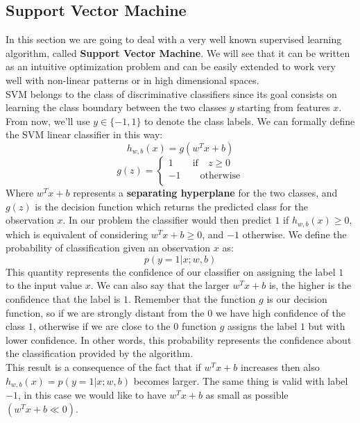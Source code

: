 \newpage
\subsection{Support Vector Machine}
In this section we are going to deal with a very well known supervised learning algorithm, called \textbf{Support Vector Machine}. We will see that it can be written as an intuitive optimization problem and can be easily extended to work very well with non-linear patterns or in high dimensional spaces.\\

SVM belongs to the class of discriminative classifiers since its goal consists on learning the class boundary between the two classes $y$ starting from features $x$. From now, we'll use $y\in\{-1,1\}$ to denote the class labels.
We can formally define the SVM linear classifier in this way:
$$h_{w,b}(x) = g(w^Tx + b)$$
$$
g(z)=
\begin{cases}
1\qquad \text{if} \quad z \geq 0\\
-1\qquad \text{otherwise}\\
\end{cases}
$$
Where $w^Tx + b$ represents a \textbf{separating hyperplane} for the two classes, and $g(z)$ is the decision function which returns the predicted class for the observation $x$.
In our problem the classifier would then predict $1$ if $h_{w,b}(x) \geq 0$, which is equivalent of considering $w^Tx + b \geq 0$, and $-1$ otherwise.
We define the probability of classification given an observation $x$ as:
$$p(y = 1 | x; w,b)$$
This quantity represents the confidence of our classifier on assigning the label $1$ to the input value $x$. We can also say that the larger $w^Tx + b$ is, the higher is the confidence that the label is $1$. Remember that the function $g$ is our decision function, so if we are strongly distant from the $0$ we have high confidence of the class $1$, otherwise if we are close to the $0$ function $g$ assigns the label $1$ but with lower confidence. In other words, this probability represents the confidence about the classification provided by the algorithm.\\
This result is a consequence of the fact that if $w^Tx + b$ increases then also $h_{w,b}(x)= p(y = 1 | x; w,b)$ becomes larger. The same thing is valid with label $-1$, in this case we would like to have $w^Tx + b$ as small as possible $(w^Tx + b \ll 0)$.\\

